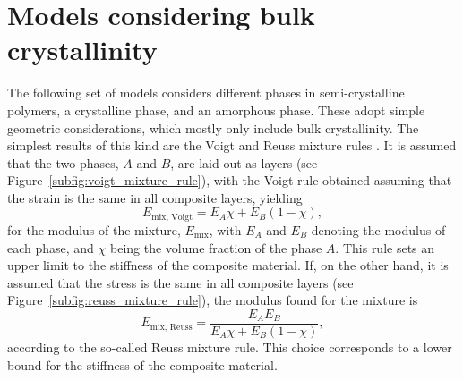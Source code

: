 \section{Models considering bulk crystallinity}
\label{sec:models_bulk_crystal}

The following set of models considers different phases in semi-crystalline polymers, a crystalline phase, and an amorphous phase.
These adopt simple geometric considerations, which mostly only include bulk crystallinity.
The simplest results of this kind are the Voigt and Reuss mixture rules \citep{wardIntroductionMechanicalProperties2004}.
It is assumed that the two phases, $A$ and $B$, are laid out as layers (see Figure~\ref{subfig:voigt_mixture_rule}), with the Voigt rule obtained assuming that the strain is the same in all composite layers, yielding
\begin{equation}
	\label{eq:voigt_mixture_rule}
	E_\text{mix, Voigt} = E_A \chi + E_B (1 - \chi),
\end{equation}
for the modulus of the mixture, $E_\text{mix}$, with $E_A$ and $E_B$ denoting the modulus of each phase, and $\chi$ being the volume fraction of the phase $A$.
This rule sets an upper limit to the stiffness of the composite material.
If, on the other hand, it is assumed that the stress is the same in all composite layers (see Figure~\ref{subfig:reuss_mixture_rule}), the modulus found for the mixture is
\begin{equation}
	E_\text{mix, Reuss} = \frac{E_A E_B}{E_A \chi + E_B (1-\chi)},
\end{equation}
according to the so-called Reuss mixture rule.
This choice corresponds to a lower bound for the stiffness of the composite material.
